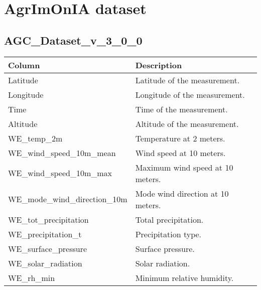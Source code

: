 \documentclass[11pt,a4paper]{article}
\begin{document}
\section{AgrImOnIA dataset}
\subsection{AGC\_Dataset\_v\_3\_0\_0}
\begin{table}[H]
    \centering
    \begin{tabular}{|l|l|}
        \hline
        \hline
        \textbf{Column}                 & \textbf{Description}                                            \\
        \hline
        Latitude                        & Latitude of the measurement.                                    \\
        Longitude                       & Longitude of the measurement.                                   \\
        Time                            & Time of the measurement.                                        \\
        Altitude                        & Altitude of the measurement.                                    \\
        WE\_temp\_2m                    & Temperature at 2 meters.                                        \\
        WE\_wind\_speed\_10m\_mean      & Wind speed at 10 meters.                                        \\
        WE\_wind\_speed\_10m\_max       & Maximum wind speed at 10 meters.                                \\
        WE\_mode\_wind\_direction\_10m  & Mode wind direction at 10 meters.                               \\
        WE\_tot\_precipitation          & Total precipitation.                                            \\
        WE\_precipitation\_t            & Precipitation type.                                             \\
        WE\_surface\_pressure           & Surface pressure.                                               \\
        WE\_solar\_radiation            & Solar radiation.                                                \\
        WE\_rh\_min                     & Minimum relative humidity.                                      \\

\end{tabular}
\end{table}
\end{document}
